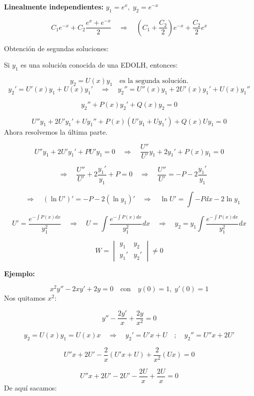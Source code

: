 \documentclass[a4paper,12pt]{article}
\begin{document}
\medskip
\noindent
\textbf{Linealmente independientes:} \quad \( y_1 = e^x, \; y_2 = e^{-x} \)

\[
C_1 e^{-x} + C_2 \frac{e^x + e^{-x}}{2}
\quad \Rightarrow \quad
\left(C_1 + \frac{C_2}{2}\right)e^{-x} + \frac{C_2}{2}e^x
\]

\medskip
\noindent
Obtención de segundas soluciones:

\medskip
\noindent
Si \( y_1 \) es una solución conocida de una EDOLH, entonces:

\[
y_2 = U(x)y_1 \quad \text{es la segunda solución.}
\]
\vspace{-.07 em}
\[
y_2' = U'(x)y_1 + U(x)y_1' \quad \Rightarrow \quad 
y_2'' = U''(x)y_1 + 2U'(x)y_1' + U(x)y_1''
\]

\[
y_2'' + P(x)y_2' + Q(x)y_2 = 0
\]

\[
U''y_1 + 2U'y_1' + U y_1'' + P(x)(U'y_1 + U y_1') + Q(x)U y_1 = 0
\]
Ahora resolvemos la última parte.

\[
U''y_1 + 2U'y_1' + PU'y_1 = 0 
\quad \Rightarrow \quad
\frac{U''}{U'} y_1 + 2y_1' + P(x)y_1 = 0
\]

\[
\quad \Rightarrow \quad 
\frac{U''}{U'} + 2\frac{y_1'}{y_1} + P = 0
\quad \Rightarrow \quad 
\frac{U''}{U'} = -P - 2\frac{y_1'}{y_1}
\]

\[
\quad \Rightarrow \quad 
(\ln U')' = -P - 2(\ln y_1)' 
\quad \Rightarrow \quad 
\ln U' = \int -Pdx - 2\ln y_1
\]

\[
U' = \frac{e^{-\int P(x)dx}}{y_1^2}
\quad \Rightarrow \quad 
U = \int\frac{e^{-\int P(x)dx}}{y_1^2} dx
\quad \Rightarrow \quad 
y_2 = y_1 \int \frac{e^{-\int P(x)dx}}{y_1^2}dx
\]

\[
W = 
\begin{vmatrix}
y_1 & y_2 \\
y_1' & y_2'
\end{vmatrix}
\neq 0
\]

\newpage
\noindent
\textbf{Ejemplo:}

\[
x^2 y'' - 2x y' + 2y = 0
\quad \text{con} \quad 
y(0) = 1, \; y'(0) = 1
\]
Nos quitamos \( x^2 \):

\[
y'' - \frac{2y'}{x} + \frac{2y}{x^2} = 0
\]

\[
y_2 = U(x)y_1 = U(x)x 
\quad \Rightarrow \quad 
y_2' = U'x + U
\quad ; \quad 
y_2'' = U''x + 2U'
\]

\[
U''x + 2U' - \frac{2}{x}(U'x + U) + \frac{2}{x^2}(Ux) = 0
\]

\[
U''x + 2U' - 2U' - \frac{2U}{x} + \frac{2U}{x} = 0 
\]
De aquí sacamos:
\end{document}
